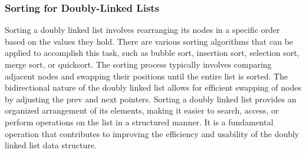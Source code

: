\subsubsection{Sorting for Doubly-Linked Lists}

Sorting a doubly linked list involves rearranging its nodes in a specific order based on the values they hold. There are various sorting algorithms that can be applied to accomplish this task, such as bubble sort, insertion sort, selection sort, merge sort, or quicksort. The sorting process typically involves comparing adjacent nodes 
and swapping their positions until the entire list is sorted. The bidirectional nature of the doubly linked list allows for efficient swapping of nodes by adjusting the prev and next pointers. Sorting a doubly linked list provides an organized arrangement of its elements, making it easier to search, access, or perform operations on 
the list in a structured manner. It is a fundamental operation that contributes to improving the efficiency and usability of the doubly linked list data structure.

